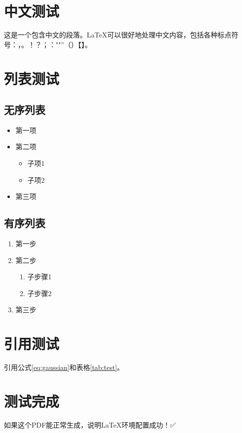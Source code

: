 \documentclass[12pt,a4paper]{article}
\begin{document}
\section{中文测试}

这是一个包含中文的段落。LaTeX可以很好地处理中文内容，包括各种标点符号：，。！？；：""''（）【】。

\section{列表测试}

\subsection{无序列表}

\begin{itemize}
    \item 第一项
    \item 第二项
    \begin{itemize}
        \item 子项1
        \item 子项2
    \end{itemize}
    \item 第三项
\end{itemize}

\subsection{有序列表}

\begin{enumerate}
    \item 第一步
    \item 第二步
    \begin{enumerate}
        \item 子步骤1
        \item 子步骤2
    \end{enumerate}
    \item 第三步
\end{enumerate}

\section{引用测试}

引用公式\eqref{eq:gaussian}和表格\ref{tab:test}。

\section{测试完成}

如果这个PDF能正常生成，说明LaTeX环境配置成功！✅
\end{document}
